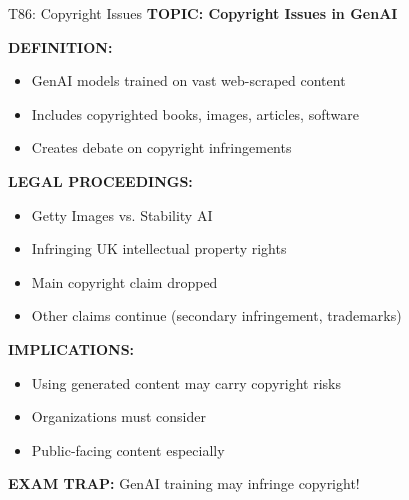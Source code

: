 \documentclass[8pt]{beamer}
\begin{document}
	\begin{frame}{T86: Copyright Issues}
		\fontsize{6.5}{7.5}\selectfont
		\textbf{TOPIC: Copyright Issues in GenAI}
		
		\vspace{0.1cm}
		\textbf{DEFINITION:}
		\begin{itemize}
			\item GenAI models trained on vast web-scraped content
			\item Includes copyrighted books, images, articles, software
			\item Creates debate on copyright infringements
		\end{itemize}
		
		\vspace{0.1cm}
		\textbf{LEGAL PROCEEDINGS:}
		\begin{itemize}
			\item Getty Images vs. Stability AI
			\item Infringing UK intellectual property rights
			\item Main copyright claim dropped
			\item Other claims continue (secondary infringement, trademarks)
		\end{itemize}
		
		\vspace{0.1cm}
		\textbf{IMPLICATIONS:}
		\begin{itemize}
			\item Using generated content may carry copyright risks
			\item Organizations must consider
			\item Public-facing content especially
		\end{itemize}
		
		\textcolor{myred}{\textbf{EXAM TRAP:}} GenAI training may \textcolor{myblue}{infringe copyright}!
	\end{frame}
	
\end{document}
